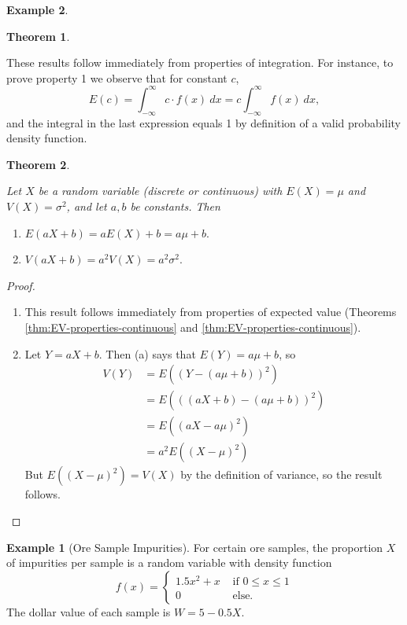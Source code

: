 \documentclass[
]{book}
\providecommand{\tightlist}{%
  \setlength{\itemsep}{0pt}\setlength{\parskip}{0pt}}
\newtheorem{theorem}{Theorem}[chapter]
\theoremstyle{definition}
\theoremstyle{definition}
\newtheorem{example}{Example}[chapter]
\theoremstyle{definition}
\theoremstyle{definition}
\theoremstyle{remark}
\begin{document}
\begin{example}
\begin{theorem}
\end{theorem}

These results follow immediately from properties of integration. For instance, to prove property 1 we observe
that for constant \(c\),
\[E(c) = \int_{-\infty}^\infty c\cdot f(x)~ dx  = c \int_{-\infty}^\infty f(x)~ dx,\]
and the integral in the last expression equals 1 by definition of a valid probability density function.

\begin{theorem}
\protect\hypertarget{thm:EV-linear-props}{}\label{thm:EV-linear-props}

Let \(X\) be a random variable (discrete or continuous) with \(E(X) = \mu\) and \(V(X) = \sigma^2\), and let \(a, b\) be constants. Then

\begin{enumerate}
\def\labelenumi{\alph{enumi})}
\tightlist
\item
  \(\displaystyle E(aX + b) = aE(X) + b = a \mu + b.\)
\item
  \(\displaystyle V(aX + b) = a^2V(X) = a^2 \sigma^2.\)
\end{enumerate}

\end{theorem}

\begin{proof}
\leavevmode

\begin{enumerate}
\def\labelenumi{\alph{enumi})}
\item
  This result follows immediately from properties of expected value (Theorems \ref{thm:EV-properties-continuous} and \ref{thm:EV-properties-continuous}).
\item
  Let \(Y = aX + b\). Then (a) says that \(E(Y) = a \mu + b\), so
  \begin{align*}
  V(Y) &= E((Y-(a\mu + b))^2) \\
   &= E\left(((aX+b)-(a\mu + b))^2\right)\\
   &= E\left((aX-a\mu)^2\right)\\
   &= a^2 E\left((X-\mu)^2\right)
  \end{align*}
  But \(E\left((X-\mu)^2\right)=V(X)\) by the definition of variance, so the result follows.
\end{enumerate}

\end{proof}

\begin{example}[Ore Sample Impurities]
\protect\hypertarget{exm:ore-samples}{}\label{exm:ore-samples}For certain ore samples, the proportion \(X\) of impurities per sample is a random variable with density function
\[
f(x)=
\begin{cases}
1.5x^2 + x &\text{ if }0 \leq x \leq 1 \\
0 &\text{ else. }
\end{cases}
\]
The dollar value of each sample is \(W = 5 - 0.5X\).


\end{example}
\end{example}
\end{document}
